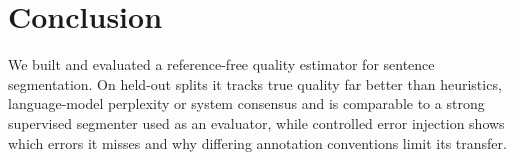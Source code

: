 
\section{Conclusion}
\label{sec:conclusion}
We built and evaluated a reference-free quality estimator for sentence segmentation. On held-out splits it tracks true
quality far better than heuristics, language-model perplexity or system consensus and is comparable to a strong
supervised segmenter used as an evaluator, while controlled error injection shows which errors it misses and why
differing annotation conventions limit its transfer.
